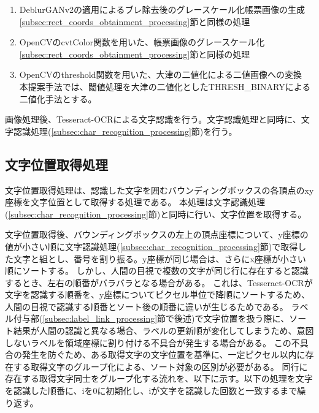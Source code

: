 \begin{enumerate}
    \item DeblurGANv2の適用によるブレ除去後のグレースケール化帳票画像の生成\\
        \ref{subsec:rect_coords_obtainment_processing}節と同様の処理
    \item OpenCVのcvtColor関数を用いた、帳票画像のグレースケール化\\
        \ref{subsec:rect_coords_obtainment_processing}節と同様の処理
    \item OpenCVのthreshold関数を用いた、大津の二値化による二値画像への変換\\
        本提案手法では、閾値処理を大津の二値化としたTHRESH\_BINARYによる二値化手法とする。
\end{enumerate}

画像処理後、Tesseract-OCRによる文字認識を行う。文字認識処理と同時に、文字認識処理(\ref{subsec:char_recognition_processing}節)を行う。


\subsection{文字位置取得処理}\label{subsec:char_position_obtainment_processing}
文字位置取得処理は、認識した文字を囲むバウンディングボックスの各頂点のxy座標を文字位置として取得する処理である。
本処理は文字認識処理(\ref{subsec:char_recognition_processing}節)と同時に行い、文字位置を取得する。

文字位置取得後、バウンディングボックスの左上の頂点座標について、y座標の値が小さい順に文字認識処理(\ref{subsec:char_recognition_processing}節)で取得した文字と組とし、番号を割り振る。y座標が同じ場合は、さらにx座標が小さい順にソートする。
しかし、人間の目視で複数の文字が同じ行に存在すると認識するとき、左右の順番がバラバラとなる場合がある。
これは、Tesseract-OCRが文字を認識する順番を、y座標についてピクセル単位で降順にソートするため、人間の目視で認識する順番とソート後の順番に違いが生じるためである。
ラベル付与部(\ref{subsec:label_link_processing}節で後述)で文字位置を扱う際に、ソート結果が人間の認識と異なる場合、ラベルの更新順が変化してしまうため、意図しないラベルを領域座標に割り付ける不具合が発生する場合がある。
この不具合の発生を防ぐため、ある取得文字の文字位置を基準に、一定ピクセル以内に存在する取得文字のグループ化による、ソート対象の区別が必要がある。
同行に存在する取得文字同士をグループ化する流れを、以下に示す。以下の処理を文字を認識した順番に、iを0に初期化し、iが文字を認識した回数と一致するまで繰り返す。

